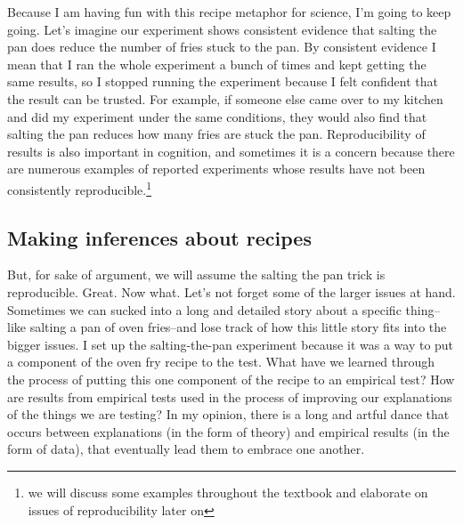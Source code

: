 \documentclass[
  oneside,
  12pt]{crumpbook}
\begin{document}
Because I am having fun with this recipe metaphor for science, I'm going to keep going. Let's imagine our experiment shows consistent evidence that salting the pan does reduce the number of fries stuck to the pan. By consistent evidence I mean that I ran the whole experiment a bunch of times and kept getting the same results, so I stopped running the experiment because I felt confident that the result can be trusted. For example, if someone else came over to my kitchen and did my experiment under the same conditions, they would also find that salting the pan reduces how many fries are stuck the pan. Reproducibility of results is also important in cognition, and sometimes it is a concern because there are numerous examples of reported experiments whose results have not been consistently reproducible.\footnote{we will discuss some examples throughout the textbook and elaborate on issues of reproducibility later on}

\hypertarget{making-inferences-about-recipes}{%
\subsection{Making inferences about recipes}\label{making-inferences-about-recipes}}

But, for sake of argument, we will assume the salting the pan trick is reproducible. Great. Now what. Let's not forget some of the larger issues at hand. Sometimes we can sucked into a long and detailed story about a specific thing-- like salting a pan of oven fries--and lose track of how this little story fits into the bigger issues. I set up the salting-the-pan experiment because it was a way to put a component of the oven fry recipe to the test. What have we learned through the process of putting this one component of the recipe to an empirical test? How are results from empirical tests used in the process of improving our explanations of the things we are testing? In my opinion, there is a long and artful dance that occurs between explanations (in the form of theory) and empirical results (in the form of data), that eventually lead them to embrace one another.
\end{document}

